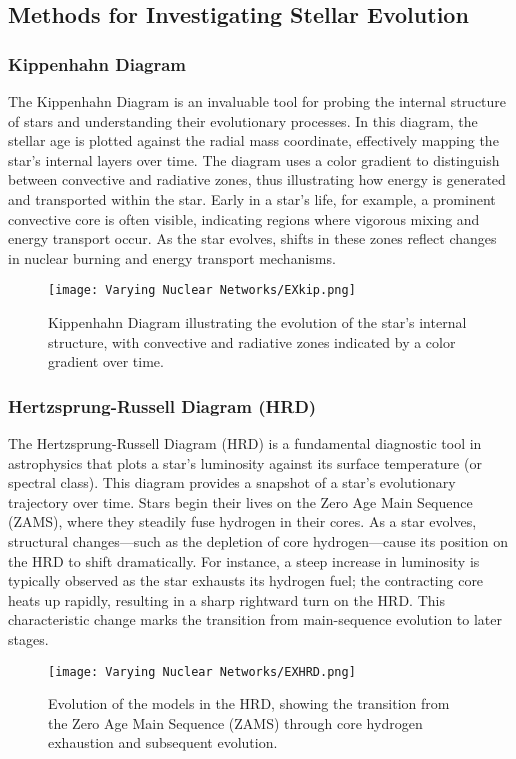 \subsection{Methods for Investigating Stellar Evolution}

\subsubsection{Kippenhahn Diagram}
The Kippenhahn Diagram is an invaluable tool for probing the internal structure of stars and understanding their evolutionary processes. In this diagram, the stellar age is plotted against the radial mass coordinate, effectively mapping the star’s internal layers over time. The diagram uses a color gradient to distinguish between convective and radiative zones, thus illustrating how energy is generated and transported within the star. Early in a star’s life, for example, a prominent convective core is often visible, indicating regions where vigorous mixing and energy transport occur. As the star evolves, shifts in these zones reflect changes in nuclear burning and energy transport mechanisms.

\begin{figure}[h!]
   \centering
   \texttt{[image: Varying Nuclear Networks/EXkip.png]}
   \caption{Kippenhahn Diagram illustrating the evolution of the star's internal structure, with convective and radiative zones indicated by a color gradient over time.}
   \label{fig:EXKip}
\end{figure}

\vspace{-2em}
\subsubsection{Hertzsprung-Russell Diagram (HRD)}
The Hertzsprung-Russell Diagram (HRD) is a fundamental diagnostic tool in astrophysics that plots a star’s luminosity against its surface temperature (or spectral class). This diagram provides a snapshot of a star’s evolutionary trajectory over time. Stars begin their lives on the Zero Age Main Sequence (ZAMS), where they steadily fuse hydrogen in their cores. As a star evolves, structural changes—such as the depletion of core hydrogen—cause its position on the HRD to shift dramatically. For instance, a steep increase in luminosity is typically observed as the star exhausts its hydrogen fuel; the contracting core heats up rapidly, resulting in a sharp rightward turn on the HRD. This characteristic change marks the transition from main-sequence evolution to later stages.

\begin{figure}[h!]
   \centering
   \texttt{[image: Varying Nuclear Networks/EXHRD.png]}
   \caption{Evolution of the models in the HRD, showing the transition from the Zero Age Main Sequence (ZAMS) through core hydrogen exhaustion and subsequent evolution.}
   \label{fig:EXHRD}
\end{figure}
